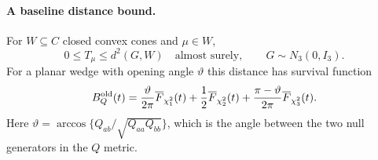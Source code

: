\paragraph{A baseline distance bound.}
For $W\subseteq C$ closed convex cones and $\mu\in W$,
\begin{equation}\label{eq:eq_pathwise_bound}
 0\leq T_\mu\leq d^2(G,W)\quad\text{almost surely},\qquad G\sim N_3(0,I_3).
\end{equation}
For a planar wedge with opening angle $\vartheta$ this distance has
survival function
\begin{equation}\label{eq:eq_old_bound}
 B_Q^{\rm old}(t)=\frac{\vartheta}{2\pi}\overline F_{\chi_1^2}(t)
 +\frac12\overline F_{\chi_2^2}(t)
 +\frac{\pi-\vartheta}{2\pi}\overline F_{\chi_3^2}(t).
\end{equation}
Here $\vartheta=\arccos\{Q_{ab}/\sqrt{Q_{aa}Q_{bb}}\}$,
which is the angle between the two null generators in the $Q$ metric.

